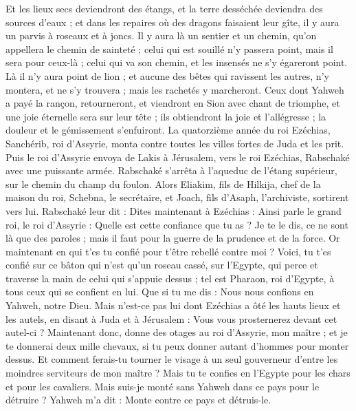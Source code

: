 \begin{multicols}{2}
Et les lieux secs deviendront des étangs, et la terre desséchée deviendra des sources d'eaux ; et dans les repaires où des dragons faisaient leur gîte, il y aura un parvis à roseaux et à joncs.
Il y aura là un sentier et un chemin, qu'on appellera le chemin de sainteté ; celui qui est souillé n'y passera point, mais il sera pour ceux-là ; celui qui va son chemin, et les insensés ne s'y égareront point.
Là il n'y aura point de lion ; et aucune des bêtes qui ravissent les autres, n'y montera, et ne s'y trouvera ; mais les rachetés y marcheront.
Ceux dont Yahweh a payé la rançon, retourneront, et viendront en Sion avec chant de triomphe, et une joie éternelle sera sur leur tête ; ils obtiendront la joie et l'allégresse ; la douleur et le gémissement s'enfuiront.
\VerseOne{}La quatorzième année du roi Ezéchias, Sanchérib, roi d'Assyrie, monta contre toutes les villes fortes de Juda et les prit.
Puis le roi d'Assyrie envoya de Lakis à Jérusalem, vers le roi Ezéchias, Rabschaké avec une puissante armée. Rabschaké s'arrêta à l'aqueduc de l'étang supérieur, sur le chemin du champ du foulon.
Alors Eliakim, fils de Hilkija, chef de la maison du roi, Schebna, le secrétaire, et Joach, fils d'Asaph, l'archiviste, sortirent vers lui.
Rabschaké leur dit : Dites maintenant à Ezéchias : Ainsi parle le grand roi, le roi d'Assyrie : Quelle est cette confiance que tu as ?
Je te le dis, ce ne sont là que des paroles ; mais il faut pour la guerre de la prudence et de la force. Or maintenant en qui t'es tu confié pour t'être rebellé contre moi ?
Voici, tu t'es confié sur ce bâton qui n'est qu'un roseau cassé, sur l'Egypte, qui perce et traverse la main de celui qui s'appuie dessus ; tel est Pharaon, roi d'Egypte, à tous ceux qui se confient en lui.
Que si tu me dis : Nous nous confions en Yahweh, notre Dieu. Mais n'est-ce pas lui dont Ezéchias a ôté les hauts lieux et les autels, en disant à Juda et à Jérusalem : Vous vous prosternerez devant cet autel-ci ?
Maintenant donc, donne des otages au roi d'Assyrie, mon maître ; et je te donnerai deux mille chevaux, si tu peux donner autant d'hommes pour monter dessus.
Et comment ferais-tu tourner le visage à un seul gouverneur d'entre les moindres serviteurs de mon maître ? Mais tu te confies en l'Egypte pour les chars et pour les cavaliers.
Mais suis-je monté sans Yahweh dans ce pays pour le détruire ? Yahweh m'a dit : Monte contre ce pays et détruis-le.

\end{multicols}
